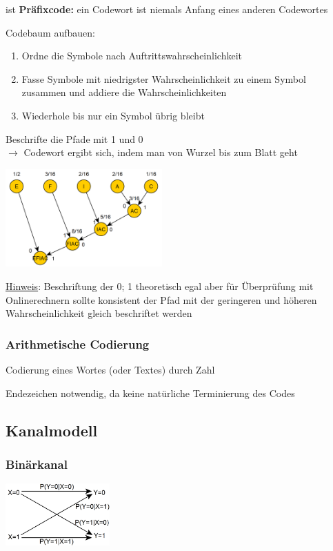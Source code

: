 ist \textbf{Präfixcode:} ein Codewort ist niemals Anfang eines anderen Codewortes

Codebaum aufbauen:
\begin{enumerate}
    \item Ordne die Symbole nach Auftrittswahrscheinlichkeit
    \item Fasse Symbole mit niedrigster Wahrscheinlichkeit zu einem Symbol zusammen und addiere die Wahrscheinlichkeiten
    \item Wiederhole bis nur ein Symbol übrig bleibt
\end{enumerate}

Beschrifte die Pfade mit 1 und 0\\
$\rightarrow$ Codewort ergibt sich, indem man von Wurzel bis zum Blatt geht

\includegraphics[width=6cm]{img/huffman.PNG}

\underline{Hinweis}: Beschriftung der 0; 1 theoretisch egal aber für Überprüfung mit Onlinerechnern
sollte konsistent der Pfad mit der geringeren und höheren Wahrscheinlichkeit gleich beschriftet
werden

\subsubsection{Arithmetische Codierung}

Codierung eines Wortes (oder Textes) durch Zahl

Endezeichen notwendig, da keine natürliche Terminierung des Codes


\subsection{Kanalmodell}

\subsubsection{Binärkanal}

\includegraphics[width=4cm]{img/kanalmodell.PNG}

